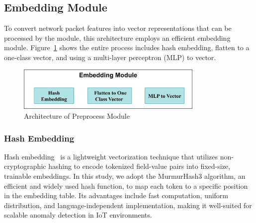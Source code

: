 \begin{ZhChapter}
    \begin{table}[htbp]
        \centering
        \caption{Example of Tokenization Process}
        \label{tab:token_example}
        \vspace{1em}
    \end{table}



    \subsection{Embedding Module} %
    To convert network packet features into vector representations that can be processed by the module, this architecture employs an efficient embedding module. Figure~\ref{fig:EmbeddedModule} shows the entire process includes hash embedding, flatten to a one-class vector, and using a multi-layer perceptron (MLP) to vector.

    \begin{figure}[htbp]
        \centering
        \includegraphics[width = 0.8\textwidth]{image/EmbeddingModule.jpg}
        \caption{Architecture of Preprocess Module }
        \label{fig:EmbeddedModule}
    \end{figure}

    \subsubsection{Hash Embedding} %
    Hash embedding~\cite{li2024embedding} is a lightweight vectorization technique that utilizes non-cryptographic hashing to encode tokenized field-value pairs into fixed-size, trainable embeddings. In this study, we adopt the MurmurHash3 algorithm, an efficient and widely used hash function, to map each token to a specific position in the embedding table. Its advantages include fast computation, uniform distribution, and language-independent implementation, making it well-suited for scalable anomaly detection in IoT environments.


\end{ZhChapter}

